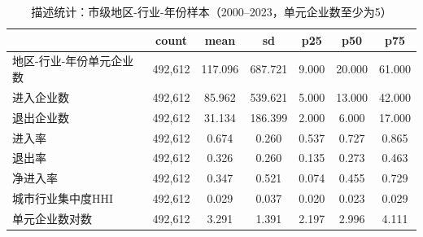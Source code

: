 \begin{table}[htbp]\centering
\def\sym#1{\ifmmode^{#1}\else\(^{#1}\)\fi}
\caption{描述统计：市级地区-行业-年份样本（2000--2023，单元企业数至少为5）}
\begin{tabular}{l*{1}{cccccc}}
\toprule
                    &       count&        mean&          sd&         p25&         p50&         p75\\
\midrule
地区-行业-年份单元企业数&     492,612&     117.096&     687.721&       9.000&      20.000&      61.000\\
进入企业数          &     492,612&      85.962&     539.621&       5.000&      13.000&      42.000\\
退出企业数          &     492,612&      31.134&     186.399&       2.000&       6.000&      17.000\\
进入率              &     492,612&       0.674&       0.260&       0.537&       0.727&       0.865\\
退出率              &     492,612&       0.326&       0.260&       0.135&       0.273&       0.463\\
净进入率            &     492,612&       0.347&       0.521&       0.074&       0.455&       0.729\\
城市行业集中度HHI   &     492,612&       0.029&       0.037&       0.020&       0.023&       0.029\\
单元企业数对数      &     492,612&       3.291&       1.391&       2.197&       2.996&       4.111\\
\bottomrule
\end{tabular}
\end{table}
